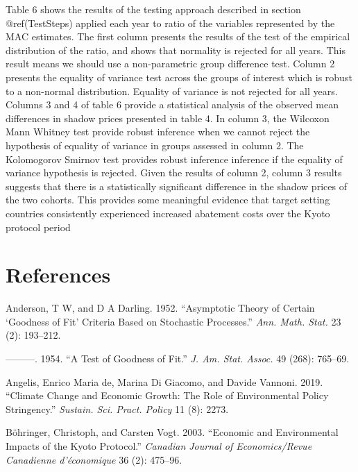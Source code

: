 \documentclass[
  10pt,
]{article}
\begin{document}
Table 6 shows the results of the testing approach described in section
@ref(TestSteps) applied each year to ratio of the variables represented
by the MAC estimates. The first column presents the results of the test
of the empirical distribution of the ratio, and shows that normality is
rejected for all years. This result means we should use a non-parametric
group difference test. Column 2 presents the equality of variance test
across the groups of interest which is robust to a non-normal
distribution. Equality of variance is not rejected for all years.
Columns 3 and 4 of table 6 provide a statistical analysis of the
observed mean differences in shadow prices presented in table 4. In
column 3, the Wilcoxon Mann Whitney test provide robust inference when
we cannot reject the hypothesis of equality of variance in groups
assessed in column 2. The Kolomogorov Smirnov test provides robust
inference inference if the equality of variance hypothesis is rejected.
Given the results of column 2, column 3 results suggests that there is a
statistically significant difference in the shadow prices of the two
cohorts. This provides some meaningful evidence that target setting
countries consistently experienced increased abatement costs over the
Kyoto protocol period

\newpage

\hypertarget{references}{%
\section*{References}\label{references}}

\hypertarget{refs}{}
\leavevmode\hypertarget{ref-Anderson1952}{}%
Anderson, T W, and D A Darling. 1952. ``Asymptotic Theory of Certain
`Goodness of Fit' Criteria Based on Stochastic Processes.'' \emph{Ann.
Math. Stat.} 23 (2): 193--212.

\leavevmode\hypertarget{ref-Anderson1954}{}%
---------. 1954. ``A Test of Goodness of Fit.'' \emph{J. Am. Stat.
Assoc.} 49 (268): 765--69.

\leavevmode\hypertarget{ref-De_Angelis2019}{}%
Angelis, Enrico Maria de, Marina Di Giacomo, and Davide Vannoni. 2019.
``Climate Change and Economic Growth: The Role of Environmental Policy
Stringency.'' \emph{Sustain. Sci. Pract. Policy} 11 (8): 2273.

\leavevmode\hypertarget{ref-Bohringer2003}{}%
Böhringer, Christoph, and Carsten Vogt. 2003. ``Economic and
Environmental Impacts of the Kyoto Protocol.'' \emph{Canadian Journal of
Economics/Revue Canadienne d'économique} 36 (2): 475--96.
\end{document}
